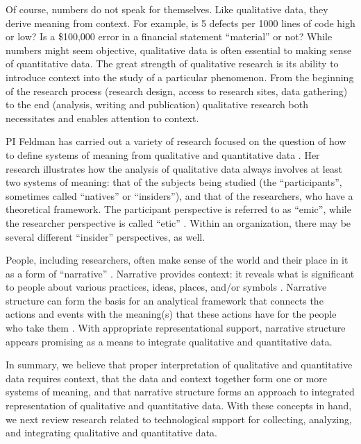 Of course, numbers do not speak for themselves. Like qualitative data, they
derive meaning from context.  For example, is 5 defects per 1000 lines of
code high or low? Is a \$100,000 error in a financial statement
``material'' or not?  While numbers might seem objective, qualitative data is
often essential to making sense of quantitative data.  The great strength of
qualitative research is its ability to introduce context into the study of
a particular phenomenon.  From the beginning of the research process
(research design, access to research sites, data gathering) to the end
(analysis, writing and publication) qualitative research both necessitates
and enables attention to context.

PI Feldman has carried out a variety of research focused on the question
of how to define systems of meaning from qualitative and quantitative data
\cite{Feldman95,Feldman04}.  Her research illustrates how the analysis of
qualitative data always involves at least two systems of meaning: that of
the subjects being studied (the ``participants'', sometimes called
``natives'' or ``insiders''), and that of the researchers, who have a
theoretical framework.  The participant perspective is referred to as
``emic'', while the researcher perspective is called ``etic''
\cite{Headland90}. Within an organization, there may be several different
``insider'' perspectives, as well.

People, including researchers, often make sense of the world and their
place in it as a form of ``narrative''
\cite{Bruner90,Gee86,Riessman93,Mishler86,Abbott91,White92,Ricoeur81}.
Narrative provides context: it reveals what is significant to people about
various practices, ideas, places, and/or symbols \cite{Young96}.  Narrative
structure can form the basis for an analytical framework that connects the
actions and events with the meaning(s) that these actions have for the
people who take them \cite{Bal85}.  With appropriate representational
support, narrative structure appears promising as a means to integrate
qualitative and quantitative data.  

In summary, we believe that proper interpretation of qualitative and
quantitative data requires context, that the data and context together form
one or more systems of meaning, and that narrative structure forms an
approach to integrated representation of qualitative and quantitative data.
With these concepts in hand, we next review research related to
technological support for collecting, analyzing, and integrating
qualitative and quantitative data.

